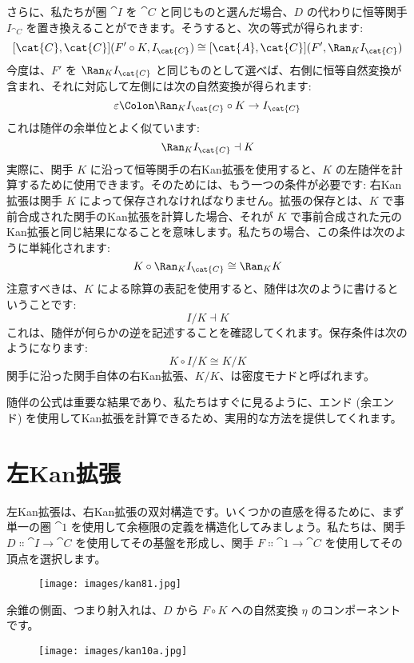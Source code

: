 \noindent
さらに、私たちが圏 $\cat{I}$ を $\cat{C}$ と同じものと選んだ場合、$D$ の代わりに恒等関手 $I_{\cat{C}}$ を置き換えることができます。そうすると、次の等式が得られます:
\[[\cat{C}, \cat{C}](F' \circ K, I_{\cat{C}}) \cong [\cat{A}, \cat{C}](F', \Ran_{K}I_{\cat{C}})\]
今度は、$F'$ を $\Ran_{K}I_{\cat{C}}$ と同じものとして選べば、右側に恒等自然変換が含まれ、それに対応して左側には次の自然変換が得られます:
\[\varepsilon \Colon \Ran_{K}I_{\cat{C}} \circ K \to I_{\cat{C}}\]
これは随伴の余単位とよく似ています:
\[\Ran_{K}I_{\cat{C}} \dashv K\]
実際に、関手 $K$ に沿って恒等関手の右Kan拡張を使用すると、$K$ の左随伴を計算するために使用できます。そのためには、もう一つの条件が必要です: 右Kan拡張は関手 $K$ によって保存されなければなりません。拡張の保存とは、$K$ で事前合成された関手のKan拡張を計算した場合、それが $K$ で事前合成された元のKan拡張と同じ結果になることを意味します。私たちの場合、この条件は次のように単純化されます:
\[K \circ \Ran_{K}I_{\cat{C}} \cong \Ran_{K}K\]
注意すべきは、$K$ による除算の表記を使用すると、随伴は次のように書けるということです:
\[I/K \dashv K\]
これは、随伴が何らかの逆を記述することを確認してくれます。保存条件は次のようになります:
\[K \circ I/K \cong K/K\]
関手に沿った関手自体の右Kan拡張、$K/K$、は密度モナドと呼ばれます。

随伴の公式は重要な結果であり、私たちはすぐに見るように、エンド (余エンド) を使用してKan拡張を計算できるため、実用的な方法を提供してくれます。

\section{左Kan拡張}

左Kan拡張は、右Kan拡張の双対構造です。いくつかの直感を得るために、まず単一の圏 $\cat{1}$ を使用して余極限の定義を構造化してみましょう。私たちは、関手 $D \Colon \cat{I} \to \cat{C}$ を使用してその基盤を形成し、関手 $F \Colon \cat{1} \to \cat{C}$ を使用してその頂点を選択します。

\begin{figure}[H]
  \centering
  \texttt{[image: images/kan81.jpg]}
\end{figure}

\noindent
余錐の側面、つまり射入れは、$D$ から $F \circ K$ への自然変換 $\eta$ のコンポーネントです。

\begin{figure}[H]
  \centering
  \texttt{[image: images/kan10a.jpg]}
\end{figure}


